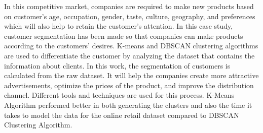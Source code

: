 \documentclass[conference]{IEEEtran}
\begin{document}
In this competitive market, companies are required to make new products based on customer's age, occupation, gender, taste, culture, geography, and preferences which will also help to retain the customer’s attention. In this case study, customer segmentation has been made so that companies can make products according to the customers' desires. K-means and DBSCAN clustering algorithms are used to differentiate the customer by analyzing the dataset that contains the information about clients. In this work, the segmentation of customers is calculated from the raw dataset. It will help the companies create more attractive advertisements, optimize the prices of the product, and improve the distribution channel. Different tools and techniques are used for this process. K-Means Algorithm performed better in both generating the clusters and also the time it takes to model the data for the online retail dataset compared to DBSCAN Clustering Algorithm.
\end{document}

